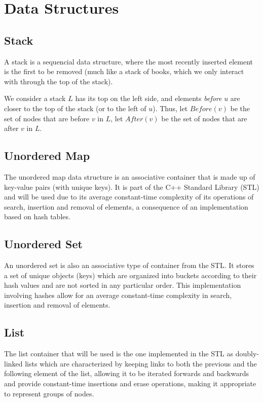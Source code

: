 \chapter{Data Structures} \label{data-structures}

\section{Stack}
A stack is a sequencial data structure, where the most recently inserted element is the first to be removed (much like a stack of books, which we only interact with through the top of the stack).\par
We consider a stack $L$ has its top on the left side, and elements \emph{before} $u$ are closer to the top of the stack (or to the left of $u$). Thus, let $Before(v)$ be the set of nodes that are before $v$ in $L$, let $After(v)$ be the set of nodes that are after $v$ in $L$.

\section{Unordered Map}
The unordered map data structure is an associative container that is made up of key-value pairs (with unique keys). It is part of the C++ Standard Library (STL) and will be used due to its average constant-time complexity of its operations of search, insertion and removal of elements, a consequence of an implementation based on hash tables.

\section{Unordered Set}
An unordered set is also an associative type of container from the STL. It stores a set of unique objects (keys) which are organized into buckets according to their hash values and are not sorted in any particular order. This implementation involving hashes allow for an average constant-time complexity in search, insertion and removal of elements.

\section{List}
The list container that will be used is the one implemented in the STL as doubly-linked lists which are characterized by keeping links to both the previous and the following element of the list, allowing it to be iterated forwards and backwards and provide constant-time insertions and erase operations, making it appropriate to represent groups of nodes.

